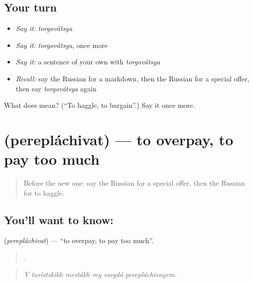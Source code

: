 \subsection*{Your turn}
\begin{itemize}
\raggedright
  \item \emph{Say it:} \emph{torgovátsya}
  \item \emph{Say it:} \emph{torgovátsya}, once more
  \item \emph{Say it:} a sentence of your own with \emph{torgovátsya}
  \item \emph{Recall:} say the Russian for a markdown, then the Russian for a special offer, then say \emph{torgovátsya} again
\end{itemize}

\begin{tcolorbox}[breakable,colback=teal!4,colframe=teal!35!black,title={Before you move on}]
What does  mean? (\textquotedblleft{}To haggle, to bargain\textquotedblright{}.) Say it once more.
\end{tcolorbox}
\section[\texorpdfstring{\ru{переплачивать} (perepláchivat)}{переплачивать (perepláchivat)}]{ (perepláchivat) — to overpay, to pay too much}

\label{lesson:RU-C454-pereplachivat}



\begin{quote}
Before the new one: say the Russian for a special offer, then the Russian for to haggle.
\end{quote}

\subsection*{You'll want to know: }
\textbf{} (\emph{perepláchivat}) — \textquotedblleft{}to overpay, to pay too much\textquotedblright{}.

\begin{quote}
     .
\end{quote}

\begin{quote}
\emph{V turístskikh mestákh my vsegdá perepláchivayem.}
\end{quote}


